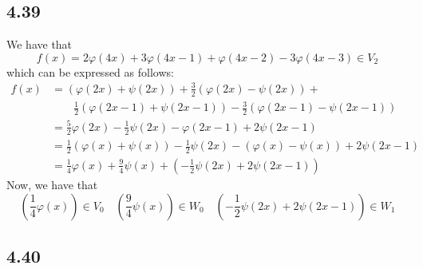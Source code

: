 \documentclass[letterpaper,12pt]{article}
\theoremstyle{definition}
\begin{document}
\subsection*{4.39}
We have that
\[f(x) = 2 \varphi (4x) + 3 \varphi(4x-1) +  \varphi(4x-2) - 3 \varphi(4x-3) \in V_2 \]
which can be expressed as follows:
\begin{align*}
    f(x) & = (\varphi(2x) + \psi(2x)) + \frac{3}{2}(\varphi(2x) - \psi(2x)) + \\
    & \quad \quad \frac{1}{2}(\varphi(2x-1) + \psi(2x-1) ) - \frac{3}{2}(\varphi(2x-1) - \psi(2x-1) ) \\
    & = \frac{5}{2} \varphi(2x) - \frac{1}{2} \psi(2x) - \varphi(2x-1) + 2 \psi(2x-1) \\
    & = \frac{1}{2} (\varphi(x) + \psi(x)) - \frac{1}{2} \psi(2x) - (\varphi(x) - \psi(x) ) + 2 \psi(2x-1) \\
    & = \frac{1}{4} \varphi(x) + \frac{9}{4}\psi(x) + (-\frac{1}{2}\psi(2x)+ 2 \psi(2x-1) )
\end{align*}
Now, we have that
\[
    \left(\frac{1}{4} \varphi(x)\right) \in V_0 \quad
    \left(\frac{9}{4}\psi(x)\right) \in W_0 \quad
    \left(-\frac{1}{2}\psi(2x)+ 2 \psi(2x-1) \right) \in W_1
\]

\subsection*{4.40}
\end{document}
